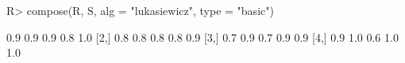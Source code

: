 \begin{Schunk}
% --begin: "comp.basic"
\begin{Sinput}
R> compose(R, S, alg = "lukasiewicz", type = "basic")
\end{Sinput}
\begin{Soutput}
     [,1] [,2] [,3] [,4] [,5]
[1,]  0.9  0.9  0.9  0.8  1.0
[2,]  0.8  0.8  0.8  0.8  0.9
[3,]  0.7  0.9  0.7  0.9  0.9
[4,]  0.9  1.0  0.6  1.0  1.0
\end{Soutput}
%
% --end: "comp.basic"
\end{Schunk}
